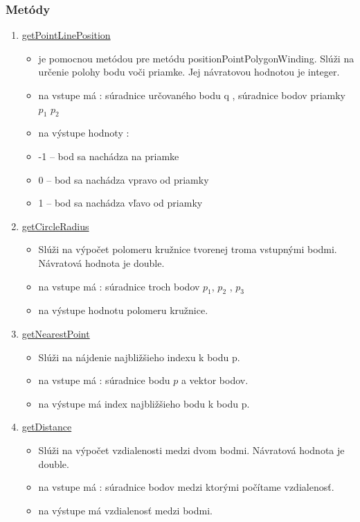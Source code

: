 \documentclass[12pt]{article}
\begin{document}
\subsubsection{Metódy}
\begin{enumerate}
\item[] \underline{getPointLinePosition}
\begin{itemize}
\item je pomocnou metódou pre metódu positionPointPolygonWinding. Slúži na určenie polohy bodu voči priamke. Jej návratovou hodnotou je integer.
\item na vstupe má : súradnice určovaného bodu q , súradnice bodov priamky $p_1$ $p_2$
\item na výstupe hodnoty :
\item[] -1 – bod sa nachádza na priamke
\item[] 0 – bod sa nachádza vpravo od priamky
\item[] 1 – bod sa nachádza vľavo od priamky
\end{itemize}

\item[] \underline{getCircleRadius}
\begin{itemize}
\item Slúži na výpočet polomeru kružnice tvorenej troma vstupnými bodmi. Návratová hodnota je double.
\item na vstupe má : súradnice troch bodov $p_1$, $p_2$ , $p_3$
\item na výstupe hodnotu polomeru kružnice.
\end{itemize}

\item[] \underline{getNearestPoint}
\begin{itemize}
\item Slúži na nájdenie najbližšieho indexu k bodu p. 
\item na vstupe má : súradnice bodu  $p$  a vektor bodov.
\item na výstupe má index najbližšieho bodu k bodu p.
\end{itemize}

\item[] \underline{getDistance}
\begin{itemize}
\item Slúži na výpočet vzdialenosti medzi dvom bodmi. Návratová hodnota je double. 
\item na vstupe má : súradnice bodov medzi ktorými počítame vzdialenosť.
\item na výstupe má vzdialenosť medzi bodmi.
\end{itemize}


\end{enumerate}
\end{document}
